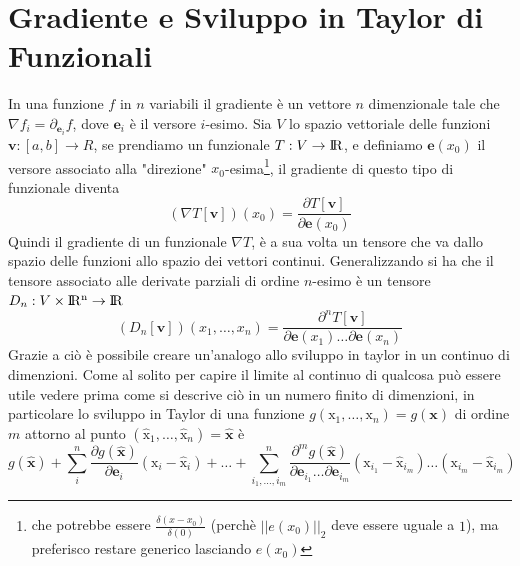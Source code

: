 \documentclass[11pt,a4paper]{report}
\newcommand{\vettore}[1]{\mathbf{#1}}
\newcommand{\vettorec}[1]{\textrm{#1}}
\theoremstyle{definition}
\theoremstyle{plain}
\theoremstyle{plain}
\begin{document}
		\section{Gradiente e Sviluppo in Taylor di Funzionali}
			In una funzione $f$ in $n$ variabili il gradiente è un vettore $n$ dimenzionale tale che $\nabla f_i=\partial_{\vettore e_i} f$, dove $\vettore e_i$ è il versore $i$-esimo.\newline
			Sia $V$ lo spazio vettoriale delle funzioni $\vettore v:[a,b]\rightarrow R$, se prendiamo un funzionale $T:V\rightarrow \rm I\!R$, e definiamo $\vettore e(x_0)$ il versore associato alla "direzione" $x_0$-esima\footnote{che potrebbe essere $\frac{\delta (x-x_0)}{\delta(0)}$ (perchè $||e(x_0)||_2$ deve essere uguale a $1$), ma preferisco restare generico lasciando $e(x_0)$}, il gradiente di questo tipo di funzionale diventa
			\begin{equation}
				(\nabla T[\vettore v])(x_0)=\frac{\partial T[\vettore v]}{\partial \vettore e(x_0)}
			\end{equation}
			Quindi  il gradiente di un funzionale $\nabla T$, è a sua volta un tensore che va dallo spazio delle funzioni allo spazio dei vettori continui.\newline
			Generalizzando si ha che il tensore associato alle derivate parziali di ordine $n$-esimo è un tensore $D_n:V\times \rm I\!R^n\rightarrow \rm I\!R$
			\begin{equation}
				(D_n[\vettore v])(x_1,\dots,x_n)=\frac{\partial^n T[\vettore v]}{\partial \vettore e(x_1)\dots\partial \vettore e(x_n)}
			\end{equation}
			Grazie a ciò è possibile creare un'analogo allo sviluppo in taylor in un continuo di dimenzioni.\newline
			Come al solito per capire il limite al continuo di qualcosa può essere utile vedere prima come si descrive ciò in un numero finito di dimenzioni, in particolare lo sviluppo in Taylor di una funzione $g(\vettorec x_1,\dots,\vettorec x_n)=g(\vettore x)$ di ordine $m$ attorno al punto $(\hat{\vettorec{x}}_1,\dots,\hat{\vettorec{x}}_n)=\vettore{\hat x}$ è
			\begin{equation}
				g(\vettore{\hat x})+\sum_{i}^{n}\frac{\partial g(\vettore{\hat x})}{\partial \vettore e_i}(\vettorec x_i-\hat{\vettorec{x}}_i)+\dots+
				\sum_{i_1,\dots,i_m}^{n}
				\frac{\partial^m g(\vettore{\hat x})}
				{\partial \vettore e_{i_1}\dots\partial \vettore e_{i_m}}
				(\vettorec x_{i_1}-\hat{\vettorec{x}}_{i_m})\dots
				(\vettorec x_{i_m}-\hat{\vettorec{x}}_{i_m})
			\end{equation}
\end{document}
